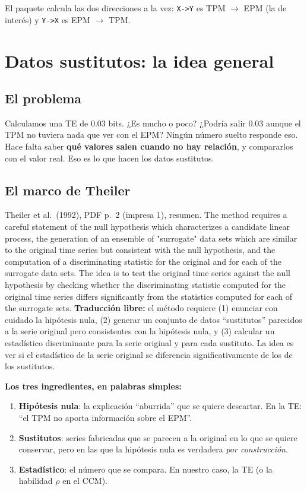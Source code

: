 \documentclass[11pt,openany]{book}
\begin{document}
El paquete calcula las dos direcciones a la vez: \texttt{X->Y} es TPM $\to$ EPM (la de interés) y \texttt{Y->X} es EPM $\to$ TPM.

\chapter{Datos sustitutos: la idea general}\label{cap:sustitutos}

\section{El problema}

Calculamos una TE de 0.03 bits. ¿Es mucho o poco? ¿Podría salir 0.03 aunque el TPM no tuviera nada que ver con el EPM? Ningún número suelto responde eso. Hace falta saber \textbf{qué valores salen cuando no hay relación}, y compararlos con el valor real. Eso es lo que hacen los datos sustitutos.

\section{El marco de Theiler}

\begin{cita}{Theiler et al.\ (1992), PDF p.~2 (impresa 1), resumen.}
The method requires a careful statement of the null hypothesis which characterizes a candidate linear process, the generation of an ensemble of "surrogate" data sets which are similar to the original time series but consistent with the null hypothesis, and the computation of a discriminating statistic for the original and for each of the surrogate data sets. The idea is to test the original time series against the null hypothesis by checking whether the discriminating statistic computed for the original time series differs significantly from the statistics computed for each of the surrogate sets.
\tcblower
\textbf{Traducción libre:} el método requiere (1) enunciar con cuidado la hipótesis nula, (2) generar un conjunto de datos ``sustitutos'' parecidos a la serie original pero consistentes con la hipótesis nula, y (3) calcular un estadístico discriminante para la serie original y para cada sustituto. La idea es ver si el estadístico de la serie original se diferencia significativamente de los de los sustitutos.
\end{cita}

\textbf{Los tres ingredientes, en palabras simples:}
\begin{enumerate}
\item \textbf{Hipótesis nula}: la explicación ``aburrida'' que se quiere descartar. En la TE: ``el TPM no aporta información sobre el EPM''.
\item \textbf{Sustitutos}: series fabricadas que se parecen a la original en lo que se quiere conservar, pero en las que la hipótesis nula es verdadera \emph{por construcción}.
\item \textbf{Estadístico}: el número que se compara. En nuestro caso, la TE (o la habilidad $\rho$ en el CCM).
\end{enumerate}
\end{document}
